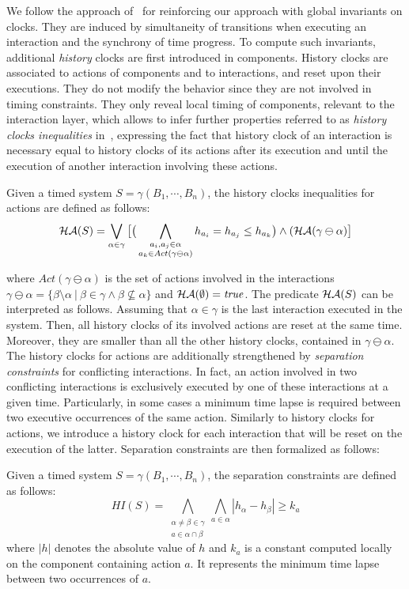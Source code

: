 We follow the approach of~\cite{hs} for reinforcing our approach with global invariants on 
clocks.
They are induced by simultaneity of transitions when executing an 
interaction and the synchrony of time progress. To compute such invariants, additional 
\emph{history} clocks are first introduced in components. History clocks are associated to 
actions of components and to interactions, and reset upon their executions.
They do not modify the behavior since they are not involved in timing constraints.
They only reveal local timing of components, relevant to the interaction layer, which 
allows to infer further properties referred to as \emph{history clocks inequalities} 
in~\cite{hs}, expressing the fact that history clock of an interaction is necessary 
equal to history clocks of its actions after its execution and until the execution of another 
interaction involving these actions.

\begin{definition}
Given a timed system $S=\gamma(B_1,\cdots,B_n)$, the history clocks inequalities for actions 
  are defined as follows:
  $$\mathcal{HA}(S)=\bigvee_{\alpha\in\gamma}\big[\big(\bigwedge_{\substack{a_i,a_j\in\alpha\\
  a_k\in Act(\gamma\ominus\alpha)}}h_{a_i}=h_{a_j}\le h_{a_k}\big)\wedge(\mathcal{HA}(\gamma\ominus
  \alpha)\big]$$
\end{definition}
\noindent where $Act(\gamma\ominus\alpha)$ is the set of actions involved in the interactions
$\gamma\ominus\alpha=\{\beta\setminus\alpha \ | \ \beta\in\gamma\wedge\beta\nsubseteq\alpha\}$
and $\mathcal{HA}(\emptyset)=\textnormal{\textit{true}}$.
The predicate $\mathcal{HA}(S)$ can be interpreted as follows. Assuming that $\alpha\in\gamma$
is the last interaction executed in the system. Then, all history clocks of its involved
actions are reset at the same time. Moreover, they are smaller than all the other history
clocks, contained in $\gamma\ominus\alpha$.
The history clocks for actions are additionally strengthened by \emph{separation constraints}
for conflicting interactions. In fact, an action involved in two conflicting interactions
is exclusively executed by one of these interactions at a given time. Particularly,
in some cases a minimum time lapse is required between two executive occurrences of
the same action. Similarly to history clocks for actions, we introduce a history clock for
each interaction that will be reset on the execution of the latter.
Separation constraints are then formalized as follows:

\begin{definition}
Given a timed system $S=\gamma(B_1,\cdots,B_n)$, the separation constraints are defined
as follows:
  \begin{displaymath}
  HI(S)=\bigwedge_{\substack{\alpha\neq\beta\in\gamma\\a\in\alpha\cap\beta}}
  \bigwedge_{a\in\alpha} |h_{\alpha}-h_{\beta}|\ge k_a
  \end{displaymath}
    where $|h|$ denotes the absolute value of $h$ and $k_a$ is a constant computed locally
on the component containing action $a$. It represents the minimum time lapse between
two occurrences of $a$.
\end{definition}

